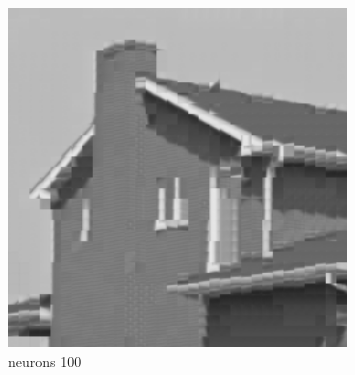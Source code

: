 \documentclass[../IDP_Task5_Karwowski_Kowalewski.tex]{subfiles}
\begin{document}
{{        \begin{figure}[!htbp]
            \begin{minipage}[c]{0.45\linewidth}
                \centering
                \includegraphics[width=0.8\textwidth]{img/kowalewski/crop_size_8_neurons_100.png}
                \caption{neurons 100}
            \end{minipage}\hfill
        \end{figure}

}}
\end{document}
